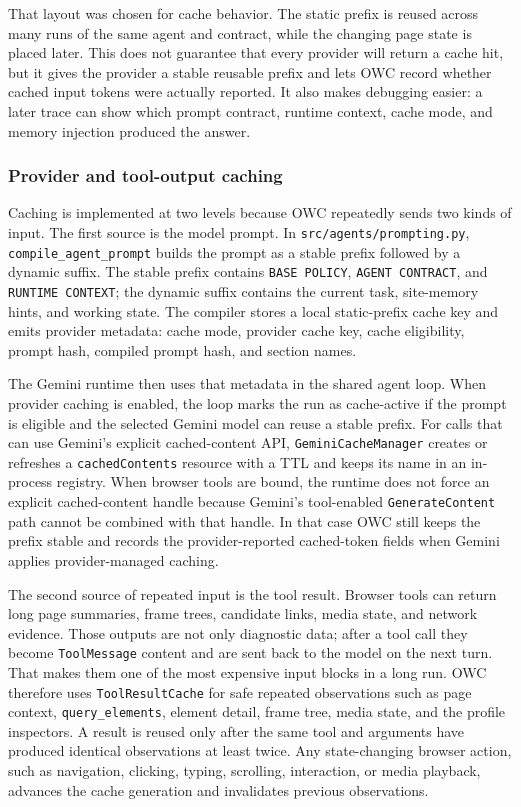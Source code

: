 That layout was chosen for cache behavior. The static prefix is reused across many runs
of the same agent and contract, while the changing page state is placed later. This does
not guarantee that every provider will return a cache hit, but it gives the provider a
stable reusable prefix and lets OWC record whether cached input tokens were actually
reported. It also makes debugging easier: a later trace can show which prompt contract,
runtime context, cache mode, and memory injection produced the answer.



\subsubsection{Provider and tool-output caching}

Caching is implemented at two levels because OWC repeatedly sends two kinds of input.
The first source is the model prompt. In \texttt{src/agents/prompting.py},
\texttt{compile\_agent\_prompt} builds the prompt as a stable prefix followed by a
dynamic suffix. The stable prefix contains \texttt{BASE POLICY}, \texttt{AGENT
CONTRACT}, and \texttt{RUNTIME CONTEXT}; the dynamic suffix contains the current task,
site-memory hints, and working state. The compiler stores a local static-prefix cache
key and emits provider metadata: cache mode, provider cache key, cache eligibility,
prompt hash, compiled prompt hash, and section names.

The Gemini runtime then uses that metadata in the shared agent loop. When provider
caching is enabled, the loop marks the run as cache-active if the prompt is eligible and
the selected Gemini model can reuse a stable prefix. For calls that can use Gemini's
explicit cached-content API, \texttt{GeminiCacheManager} creates or refreshes a
\texttt{cachedContents} resource with a TTL and keeps its name in an in-process registry.
When browser tools are bound, the runtime does not force an explicit cached-content
handle because Gemini's tool-enabled \texttt{GenerateContent} path cannot be combined
with that handle. In that case OWC still keeps the prefix stable and records the
provider-reported cached-token fields when Gemini applies provider-managed caching.

The second source of repeated input is the tool result. Browser tools can return long
page summaries, frame trees, candidate links, media state, and network evidence. Those
outputs are not only diagnostic data; after a tool call they become
\texttt{ToolMessage} content and are sent back to the model on the next turn. That makes
them one of the most expensive input blocks in a long run. OWC therefore uses
\texttt{ToolResultCache} for safe repeated observations such as page context,
\texttt{query\_elements}, element detail, frame tree, media state, and the profile
inspectors. A result is reused only after the same tool and arguments have produced
identical observations at least twice. Any state-changing browser action, such as
navigation, clicking, typing, scrolling, interaction, or media playback, advances the
cache generation and invalidates previous observations.

